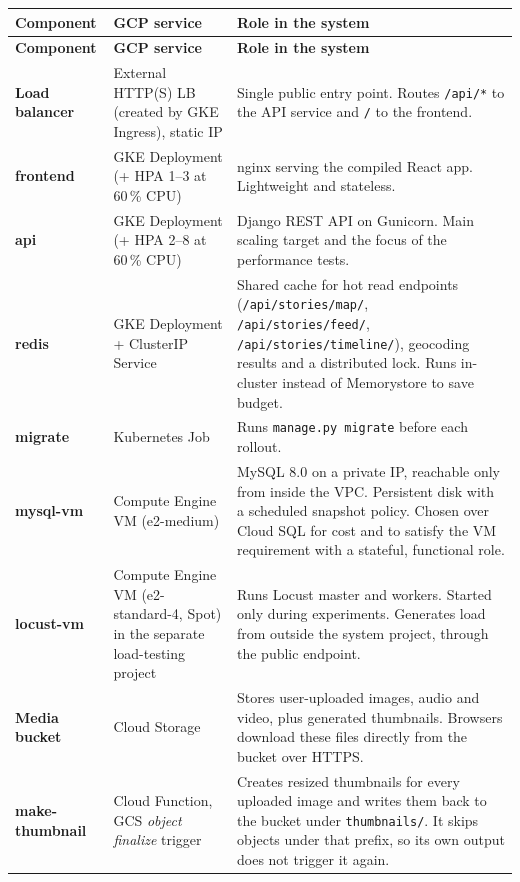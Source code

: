 \documentclass[11pt,a4paper]{article}
\newcommand{\code}[1]{\texttt{#1}}
\begin{document}
{\small
\begin{longtable}{L{3.1cm}L{4.3cm}L{7.6cm}}
\toprule
\textbf{Component} & \textbf{GCP service} & \textbf{Role in the system} \\
\midrule
\endfirsthead
\toprule
\textbf{Component} & \textbf{GCP service} & \textbf{Role in the system} \\
\midrule
\endhead
\bottomrule
\endfoot
\textbf{Load balancer} & External HTTP(S) LB (created by GKE Ingress), static IP &
  Single public entry point. Routes \code{/api/*} to the API service and
  \code{/} to the frontend. \\
\textbf{frontend} & GKE Deployment (+ HPA 1--3 at 60\,\% CPU) &
  nginx serving the compiled React app. Lightweight and stateless. \\
\textbf{api} & GKE Deployment (+ HPA 2--8 at 60\,\% CPU) &
  Django REST API on Gunicorn. Main scaling target and the focus of the
  performance tests. \\
\textbf{redis} & GKE Deployment + ClusterIP Service &
  Shared cache for hot read endpoints (\code{/api/stories/map/},
  \code{/api/stories/feed/}, \code{/api/stories/timeline/}), geocoding results and a
  distributed lock. Runs in-cluster instead of Memorystore to save budget. \\
\textbf{migrate} & Kubernetes Job &
  Runs \code{manage.py migrate} before each rollout. \\
\textbf{mysql-vm} & Compute Engine VM (e2-medium) &
  MySQL 8.0 on a private IP, reachable only from inside the VPC. Persistent
  disk with a scheduled snapshot policy. Chosen over Cloud SQL for cost and to
  satisfy the VM requirement with a stateful, functional role. \\
\textbf{locust-vm} & Compute Engine VM (e2-standard-4, Spot) in the separate load-testing project &
  Runs Locust master and workers. Started only during experiments. Generates
  load from outside the system project, through the public endpoint. \\
\textbf{Media bucket} & Cloud Storage &
  Stores user-uploaded images, audio and video, plus generated thumbnails.
  Browsers download these files directly from the bucket over HTTPS. \\
\textbf{make-thumbnail} & Cloud Function, GCS \emph{object finalize} trigger &
  Creates resized thumbnails for every uploaded image and writes them back to
  the bucket under \code{thumbnails/}. It skips objects under that prefix, so
  its own output does not trigger it again. \\

\end{longtable}}
\end{document}
